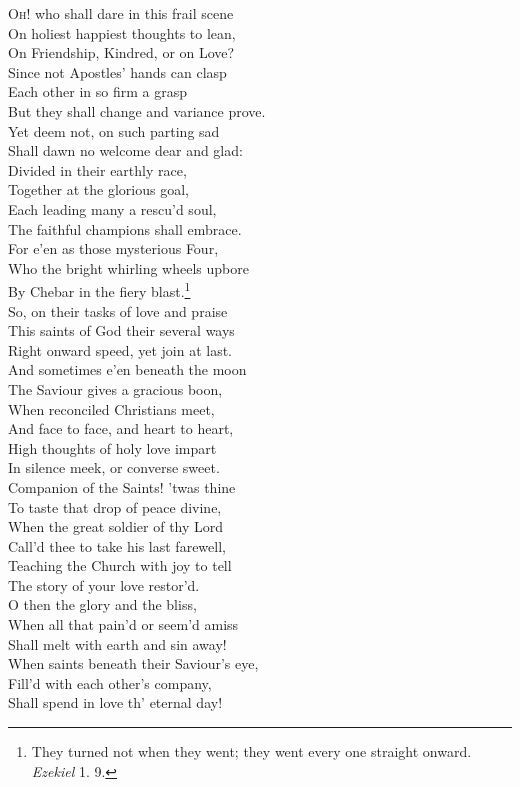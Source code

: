 \textsc{Oh}! who shall dare in this frail scene \\
 On holiest happiest thoughts to lean, \\
 On Friendship, Kindred, or on Love? \\
 Since not Apostles’ hands can clasp \\
 Each other in so firm a grasp \\
 But they shall change and variance prove. \\
  Yet deem not, on such parting sad \\
 Shall dawn no welcome dear and glad: \\
 Divided in their earthly race, \\
 Together at the glorious goal, \\
 Each leading many a rescu’d soul, \\
 The faithful champions shall embrace. \\
  For e’en as those mysterious Four, \\
 Who the bright whirling wheels upbore \\
 By Chebar in the fiery blast.\footnote{They turned not when they went; they went every one straight onward. \emph{Ezekiel} 1. 9.} \\
 So, on their tasks of love and praise \\
 This saints of God their several ways \\
 Right onward speed, yet join at last. \\
  And sometimes e’en beneath the moon \\
 The Saviour gives a gracious boon, \\
 When reconciled Christians meet, \\
 And face to face, and heart to heart, \\
 High thoughts of holy love impart \\
 In silence meek, or converse sweet. \\
  Companion of the Saints! ’twas thine \\
 To taste that drop of peace divine, \\
 When the great soldier of thy Lord \\
 Call’d thee to take his last farewell, \\
 Teaching the Church with joy to tell \\
 The story of your love restor’d. \\
  O then the glory and the bliss, \\
 When all that pain’d or seem’d amiss \\
 Shall melt with earth and sin away! \\
 When saints beneath their Saviour’s eye, \\
 Fill’d with each other’s company, \\
 Shall spend in love th’ eternal day!\\

